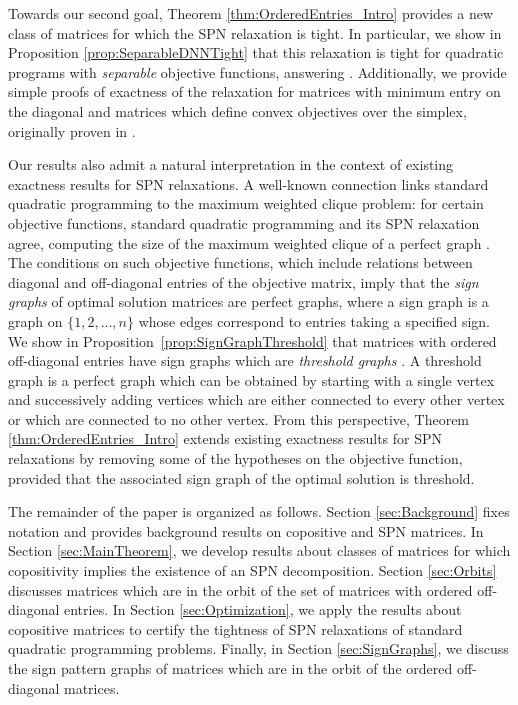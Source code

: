 \documentclass{amsart}
\theoremstyle{definition}
\begin{document}
Towards our second goal, Theorem \ref{thm:OrderedEntries_Intro} provides a new class of matrices for which the SPN relaxation is tight. In particular, we show in Proposition \ref{prop:SeparableDNNTight} that this relaxation is tight for quadratic programs with \emph{separable} objective functions, answering \cite[Conjecture 1]{dey_convexification_2025-1}. Additionally,
we provide simple proofs of exactness of the relaxation for matrices with minimum entry on the diagonal and matrices which define convex objectives over the simplex, originally proven in  \cite{gokmen2022standard}.


Our results also admit a natural interpretation in the context of existing exactness results for SPN relaxations. A well-known connection links standard quadratic programming to the maximum weighted clique problem: for certain objective functions, standard quadratic programming and its SPN relaxation agree, computing the size of the maximum weighted clique of a perfect graph \cite{gibbons1997continuous, motzkin_maxima_1965, gokmen2022standard}. The conditions on such objective functions, which include relations between diagonal and off-diagonal entries of the objective matrix, imply that the \emph{sign graphs} of optimal solution matrices are perfect graphs, where a sign graph is a graph on $\{1,2,\dots,n\}$ whose edges correspond to entries taking a specified sign.
We show in Proposition~\ref{prop:SignGraphThreshold} that matrices with ordered off-diagonal entries have sign graphs which are \emph{threshold graphs} \cite{chvatal_aggregation_1977}. A threshold graph is a perfect graph which can be obtained by starting with a single vertex and successively adding vertices which are either connected to every other vertex or which are connected to no other vertex. From this perspective, Theorem \ref{thm:OrderedEntries_Intro} extends existing exactness results for SPN relaxations by removing some of the hypotheses on the objective function, provided that the associated sign graph of the optimal solution is threshold.


The remainder of the paper is organized as follows. Section \ref{sec:Background} fixes notation and provides background results on copositive and SPN matrices. In Section \ref{sec:MainTheorem}, we develop results about classes of matrices for which copositivity implies the existence of an SPN decomposition. Section \ref{sec:Orbits} discusses matrices which are in the orbit of the set of matrices with ordered off-diagonal entries. In Section \ref{sec:Optimization}, we apply the results about copositive matrices to certify the tightness of SPN relaxations of standard quadratic programming problems. Finally, in Section \ref{sec:SignGraphs}, we discuss the sign pattern graphs of matrices which are in the orbit of the ordered off-diagonal matrices.  
\end{document}
